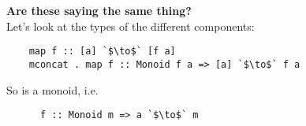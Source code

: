 \documentclass[12pt]{article}
\begin{document}
{\bf Are these saying the same thing?}\\
Let's look at the types of the different components:
\begin{normalfont}
  \begin{verbatim}
    map f :: [a] `$\to$` [f a]
    mconcat . map f :: Monoid f a => [a] `$\to$` f a
  \end{verbatim}
  So  is a monoid, i.e.
  \begin{normalfont}
    \begin{verbatim}
      f :: Monoid m => a `$\to$` m
    \end{verbatim}
  \end{normalfont}
\end{normalfont}
\end{document}
